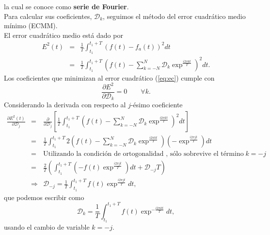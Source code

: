 \documentclass{article}
\begin{document}
la cual se conoce como \textbf{serie de Fourier}.\\
Para calcular sus coeficientes, $\mathscr{D}_k$, seguimos el m\'etodo del error cuadr\'atico medio m\'inimo (ECMM).\\
El error cuadr\'atico medio est\'a dado por
\begin{eqnarray}
E^2(t)&=&\frac{1}{T}\int_{t_1}^{t_1+T}(f(t)-f_a(t))^2 dt \nonumber \\
&=&\frac{1}{T}\int_{t_1}^{t_1+T}\left(f(t)-\sum_{k=-N}^N\mathscr{D}_k\exp^{\frac{i2\pi kt}{T}}\right)^2 dt. \label{eq:ec}
\end{eqnarray}
Los coeficientes que minimizan al error cuadr\'atico (\ref{eq:ec}) cumple con
\begin{equation}
\frac{\partial E^2}{\partial\mathscr{D}_k}=0\qquad\forall k.
\end{equation}
Considerando la derivada con respecto al $j$-\'esimo coeficiente
\begin{eqnarray}
\frac{\partial E^2(t)}{\partial\mathscr{D}_j}&=&\frac{\partial}{\partial\mathscr{D}_j}\left[\frac{1}{T}\int_{t_1}^{t_1+T}\left(f(t)-\sum_{k=-N}^N\mathscr{D}_k\exp^{\frac{i2\pi kt}{T}}\right)^2 dt\right] \nonumber \\
&=&\frac{1}{T}\int_{t_1}^{t_1+T}2\left(f(t)-\sum_{k=-N}^N\mathscr{D}_k\exp^{\frac{i2\pi kt}{T}}\right)\left( -\exp^{\frac{i2\pi jt}{T}}\right)dt \nonumber \\
&=&\textrm{Utilizando la condici\'on de ortogonalidad , s\'olo sobrevive el t\'ermino }k=-j \nonumber \\
&=&\frac{2}{T}\left(\int_{t_1}^{t_1+T}\left(-f(t)\exp^{\frac{i2\pi jt}{T}}\right)dt+\mathscr{D}_{-j}T\right) \nonumber \\
&\Rightarrow &\mathscr{D}_{-j}=\frac{1}{T}\int_{t_1}^{t_1+T}f(t)\exp^{\frac{i2\pi jt}{T}}dt,
\end{eqnarray}
que podemos escribir como
\begin{equation}
\mathscr{D}_k=\frac{1}{T}\int_{t_1}^{t_1+T}f(t)\exp^{-\frac{i2\pi kt}{T}}dt,
\end{equation}
usando el cambio de variable $k=-j$.



\end{document}
